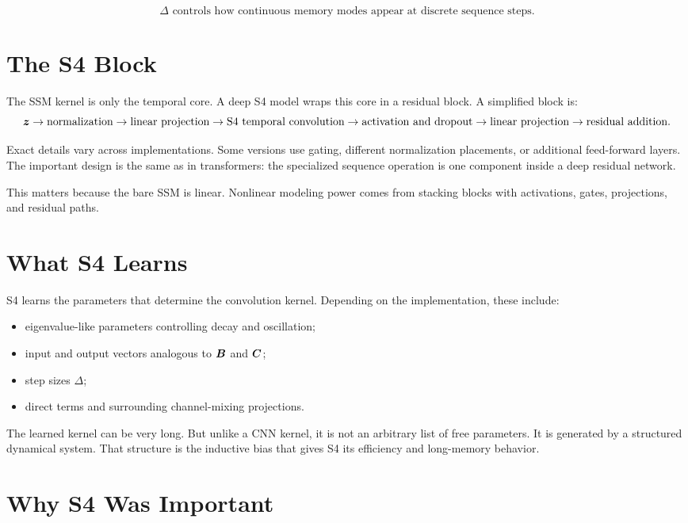 \[
  \Delta
  \text{ controls how continuous memory modes appear at discrete sequence steps.}
\]

\section{The S4 Block}

The SSM kernel is only the temporal core. A deep S4 model wraps this core in a residual
block. A simplified block is:
\[
  \bm{z}
  \rightarrow
  \text{normalization}
  \rightarrow
  \text{linear projection}
  \rightarrow
  \text{S4 temporal convolution}
  \rightarrow
  \text{activation and dropout}
  \rightarrow
  \text{linear projection}
  \rightarrow
  \text{residual addition}.
\]

Exact details vary across implementations. Some versions use gating, different
normalization placements, or additional feed-forward layers. The important design is the
same as in transformers: the specialized sequence operation is one component inside a
deep residual network.

This matters because the bare SSM is linear. Nonlinear modeling power comes from stacking
blocks with activations, gates, projections, and residual paths.

\section{What S4 Learns}

S4 learns the parameters that determine the convolution kernel. Depending on the
implementation, these include:

\begin{itemize}
  \item eigenvalue-like parameters controlling decay and oscillation;
  \item input and output vectors analogous to $\bm{B}$ and $\bm{C}$;
  \item step sizes $\Delta$;
  \item direct terms and surrounding channel-mixing projections.
\end{itemize}

The learned kernel can be very long. But unlike a CNN kernel, it is not an arbitrary list
of free parameters. It is generated by a structured dynamical system. That structure is
the inductive bias that gives S4 its efficiency and long-memory behavior.

\section{Why S4 Was Important}

